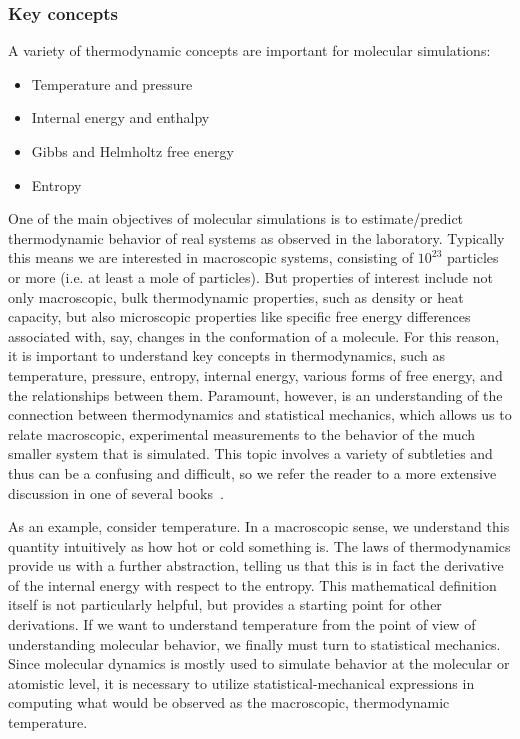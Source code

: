 \documentclass[9pt,bestpractices]{livecoms}
\begin{document}
\subsubsection{Key concepts}
A variety of thermodynamic concepts are important for molecular simulations:
\begin{itemize}
\item Temperature and pressure %
\item Internal energy and enthalpy
\item Gibbs and Helmholtz free energy
\item Entropy
\end{itemize}

One of the main objectives of molecular simulations is to estimate/predict thermodynamic behavior of real systems as observed in the laboratory.
Typically this means we are interested in macroscopic systems, consisting of $10^{23}$ particles or more (i.e. at least a mole of particles).
But properties of interest include not only macroscopic, bulk thermodynamic properties, such as density or heat capacity,
but also microscopic properties like specific free energy differences associated with, say, changes in the conformation of a molecule.
For this reason, it is important to understand key concepts in thermodynamics, such as temperature, pressure, entropy, internal energy, various forms of free energy, and the relationships between them.
Paramount, however, is an understanding of the connection between thermodynamics and statistical mechanics, which allows us to relate macroscopic, experimental measurements to the behavior of the much smaller system that is simulated.
This topic involves a variety of subtleties and thus can be a confusing and difficult, so we refer the reader to a more extensive discussion in one of several books~\cite{ShellBook, DillBook}.

As an example, consider temperature.
In a macroscopic sense, we understand this quantity intuitively as how hot or cold something is.
The laws of thermodynamics provide us with a further abstraction, telling us that this is in fact the derivative of the internal energy with respect to the entropy.
This mathematical definition itself is not particularly helpful, but provides a starting point for other derivations.
If we want to understand temperature from the point of view of understanding molecular behavior, we finally must turn to statistical mechanics.
Since molecular dynamics is mostly used to simulate behavior at the molecular or atomistic level, it is necessary to utilize statistical-mechanical expressions in computing what would be observed as the macroscopic, thermodynamic temperature.
\end{document}

